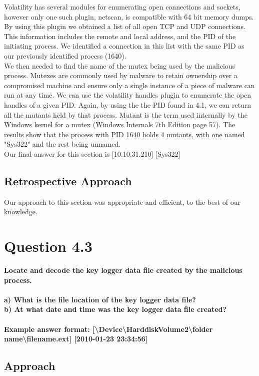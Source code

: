 Volatility has several modules for enumerating open connections and sockets, however only one such plugin, netscan, is compatible with 64 bit memory dumps. By using this plugin we obtained a list of all open TCP and UDP connections. This information includes the remote and local address, and the PID of the initiating process. We identified a connection in this list with the same PID as our previously identified process (1640). \\
We then needed to find the name of the mutex being used by the malicious process. Mutexes are commonly used by malware to retain ownership over a compromised machine and ensure only a single instance of a piece of malware can run at any time. We can use the volatility handles plugin to enumerate the open handles of a given PID. Again, by using the the PID found in 4.1, we can return all the mutants held by that process. Mutant is the term used internally by the Windows kernel for a mutex (Windows Internals 7th Edition page 57). The results show that the process with PID 1640 holds 4 mutants, with one named "Sys322" and the rest being unnamed.\\
Our final answer for this section is [10.10.31.210] [Sys322]

\subsection{Retrospective Approach}
Our approach to this section was appropriate and efficient, to the best of our knowledge.
\section{Question 4.3}
\textbf{Locate and decode the key logger data file created by the malicious
process.\\
\\a) What is the file location of the key logger data file?
\\b) At what date and time was the key logger data file created?
\\\\
Example answer format:
[\textbackslash{}Device\textbackslash{}HarddiskVolume2\textbackslash{}folder
name\textbackslash{}filename.ext] [2010-01-23 23:34:56]}
\subsection{Approach}


